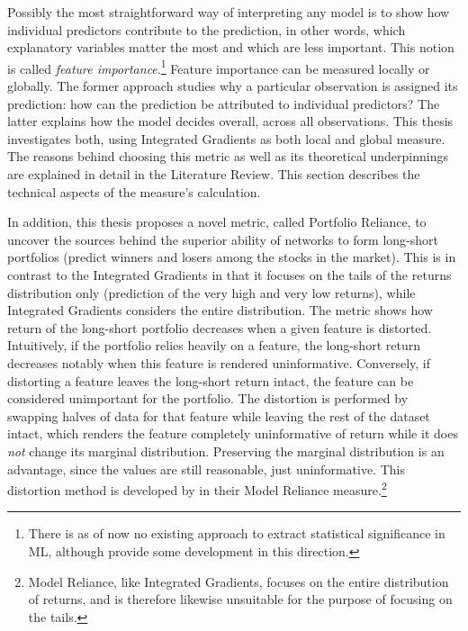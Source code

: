 		Possibly the most straightforward way of interpreting any model is to show how individual predictors contribute to the prediction, in other words, which explanatory variables matter the most and which are less important. This notion is called \textit{feature importance}.\footnote{There is as of now no existing approach to extract statistical significance in ML, although \cite{fisher2019all} provide some development in this direction.} Feature importance can be measured locally or globally. The former approach studies why a particular observation is assigned its prediction: how can the prediction be attributed to individual predictors? The latter explains how the model decides overall, across all observations. This thesis investigates both, using Integrated Gradients \citep{sundararajan2017axiomatic} as both local and global measure. The reasons behind choosing this metric as well as its theoretical underpinnings are explained in detail in the Literature Review. This section describes the technical aspects of the measure's calculation.	
		
		In addition, this thesis proposes a novel metric, called Portfolio Reliance, to uncover the sources behind the superior ability of networks to form long-short portfolios (predict winners and losers among the stocks in the market). This is in contrast to the Integrated Gradients in that it focuses on the tails of the returns distribution only (prediction of the very high and very low returns), while Integrated Gradients considers the entire distribution. The metric shows how return of the long-short portfolio decreases when a given feature is distorted. Intuitively, if the portfolio relies heavily on a feature, the long-short return decreases notably when this feature is rendered uninformative. Conversely, if distorting a feature leaves the long-short return intact, the feature can be considered unimportant for the portfolio. The distortion is performed by swapping halves of data for that feature while leaving the rest of the dataset intact, which renders the feature completely uninformative of return while it does \textit{not} change its marginal distribution. Preserving the marginal distribution is an advantage, since the values are still reasonable, just uninformative. This distortion method is developed by  \cite{fisher2019all} in their Model Reliance measure.\footnote{Model Reliance, like Integrated Gradients, focuses on the entire distribution of returns, and is therefore likewise unsuitable for the purpose of focusing on the tails.}
		
